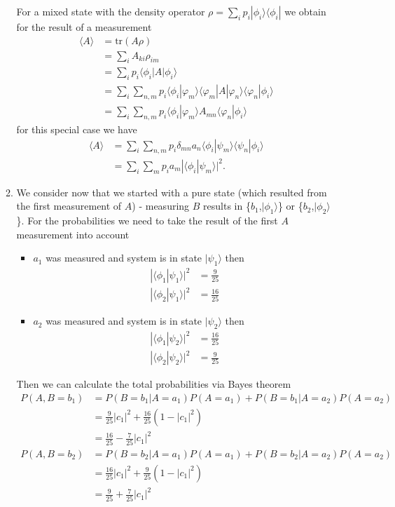\documentclass{article}
\begin{document}
\begin{enumerate}
\begin{enumerate}
    For a mixed state with the density operator $\rho=\sum_ip_i|\phi_i\rangle\langle\phi_i|$ we obtain for the result of a measurement
    \begin{align}
        \langle A\rangle&=\text{tr}(A\rho)\\
        &=\sum_iA_{ki}\rho_{im}\\
        &=\sum_ip_i\langle\phi_i|A|\phi_i\rangle\\
        &=\sum_i\sum_{n,m}p_i\langle\phi_i|\varphi_m\rangle\langle\varphi_m|A|\varphi_n\rangle\langle\varphi_n|\phi_i\rangle\\
        &=\sum_i\sum_{n,m}p_i\langle\phi_i|\varphi_m\rangle A_{mn}\langle\varphi_n|\phi_i\rangle
    \end{align}
    for this special case we have
    \begin{align}
        \langle A\rangle
        &=\sum_i\sum_{n,m}p_i\delta_{mn}a_n\langle\phi_i|\psi_m\rangle \langle\psi_n|\phi_i\rangle\\
        &=\sum_i\sum_{m}p_ia_m|\langle\phi_i|\psi_m\rangle|^2.
    \end{align}
    
    \item We consider now that we started with a pure state (which resulted from the first measurement of $A$) - measuring $B$ results in \{$b_1$,$|\phi_1\rangle$\} or \{$b_2$,$|\phi_2\rangle$\}. For the probabilities we need to take the result of the first $A$ measurement into account
    \begin{itemize}
        \item $a_1$ was measured and system is in state $|\psi_1\rangle$ then
        \begin{align}
            |\langle\phi_1|\psi_1\rangle|^2&=\frac{9}{25}\\
            |\langle\phi_2|\psi_1\rangle|^2&=\frac{16}{25}
        \end{align}
        
        \item $a_2$ was measured and system is in state $|\psi_2\rangle$ then
        \begin{align}
            |\langle\phi_1|\psi_2\rangle|^2&=\frac{16}{25}\\
            |\langle\phi_2|\psi_2\rangle|^2&=\frac{9}{25}
        \end{align}
    \end{itemize}
    Then we can calculate the total probabilities via Bayes theorem
    \begin{align}
        P(A,B=b_1)
        &=P(B=b_1|A=a_1)P(A=a_1)+P(B=b_1|A=a_2)P(A=a_2)\\
        &=\frac{9}{25}|c_1|^2+\frac{16}{25}(1-|c_1|^2)\\
        &=\frac{16}{25}-\frac{7}{25}|c_1|^2\\
        P(A,B=b_2)
        &=P(B=b_2|A=a_1)P(A=a_1)+P(B=b_2|A=a_2)P(A=a_2)\\
        &=\frac{16}{25}|c_1|^2+\frac{9}{25}(1-|c_1|^2)\\
        &=\frac{9}{25}+\frac{7}{25}|c_1|^2
    \end{align}
    

\end{enumerate}
\end{enumerate}
\end{document}
